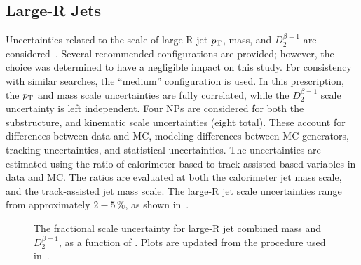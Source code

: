 \subsection{Large-R Jets}
\label{ch:syst:largerjets}
Uncertainties related to the scale of large-R jet $p_{\text{T}}$, mass, and $D_2^{\beta=1}$ are considered~\cite{J_scale_unc}. Several recommended configurations are provided; however, the choice was determined to have a negligible impact on this study. For consistency with similar searches, the ``medium'' configuration is used.  In this prescription, the $p_{\text{T}}$ and mass scale uncertainties are fully correlated, while the $D_2^{\beta=1}$ scale uncertainty is left independent.  Four NPs are considered for both the substructure, and kinematic scale uncertainties (eight total). These account for differences between data and MC, modeling differences between MC generators, tracking uncertainties, and statistical uncertainties. The uncertainties are estimated using the ratio of calorimeter-based to track-assisted-based variables in data and MC. The ratios are evaluated at both the calorimeter jet mass scale, and the track-assisted jet mass scale. The large-R jet scale uncertainties range from approximately $2-5\,\%$, as shown in~\Fig{\ref{fig:J_unc}}.

\begin{figure}[tb]
\centering
{}
\caption[Fractional scale uncertainty for large-R jet \pT, mass, and $D_2^{\beta=1}$]{The fractional scale uncertainty for large-R jet \protect{} combined mass and \protect{} $D_2^{\beta=1}$, as a function of  \pt. Plots are updated from the procedure used in~.}
\label{fig:J_unc}
\end{figure}


